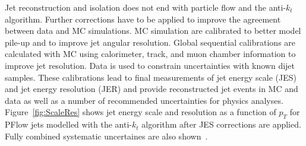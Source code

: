 Jet reconstruction and isolation does not end with particle flow and the anti-$k_t$ algorithm. Further corrections have to be applied to improve the agreement between data and MC simulations. MC simulation are calibrated to better model pile-up and to improve jet angular resolution. Global sequential calibrations are calculated with MC using calorimeter, track, and muon chamber information to improve jet resolution. Data is used to constrain uncertainties with known dijet samples. These calibrations lead to final measurements of jet energy scale (JES) and jet energy resolution (JER) and provide reconstructed jet events in MC and data as well as a number of recommended uncertainties for physics analyses.  Figure~\ref{fig:ScaleRes} shows jet energy scale and resolution as a function of $p_T$ for PFlow jets modelled with the anti-$k_t$ algorithm after JES corrections are applied. Fully combined systematic uncertaines are also shown~\cite{jetscaleres}.
